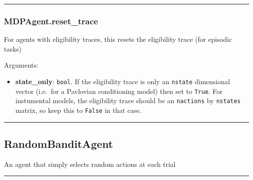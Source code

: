 \begin{center}\rule{0.5\linewidth}{\linethickness}\end{center}

\subsubsection{MDPAgent.reset\_trace}\label{mdpagent.reset_trace}

\begin{Shaded}
\begin{Highlighting}[]
\OperatorTok{=}\NormalTok{)}
\end{Highlighting}
\end{Shaded}

For agents with eligibility traces, this resets the eligibility trace
(for episodic tasks)

Arguments:

\begin{itemize}
\tightlist
\item
  \textbf{state\_only}: \texttt{bool}. If the eligibility trace is only
  an \texttt{nstate} dimensional vector (i.e.~for a Pavlovian
  conditioning model) then set to \texttt{True}. For instumental models,
  the eligibility trace should be an \texttt{nactions} by
  \texttt{nstates} matrix, so keep this to \texttt{False} in that case.
\end{itemize}

\begin{center}\rule{0.5\linewidth}{\linethickness}\end{center}

\subsection{RandomBanditAgent}\label{randombanditagent}

\begin{Shaded}
\begin{Highlighting}[]
\end{Highlighting}
\end{Shaded}

An agent that simply selects random actions at each trial

\begin{center}\rule{0.5\linewidth}{\linethickness}\end{center}

